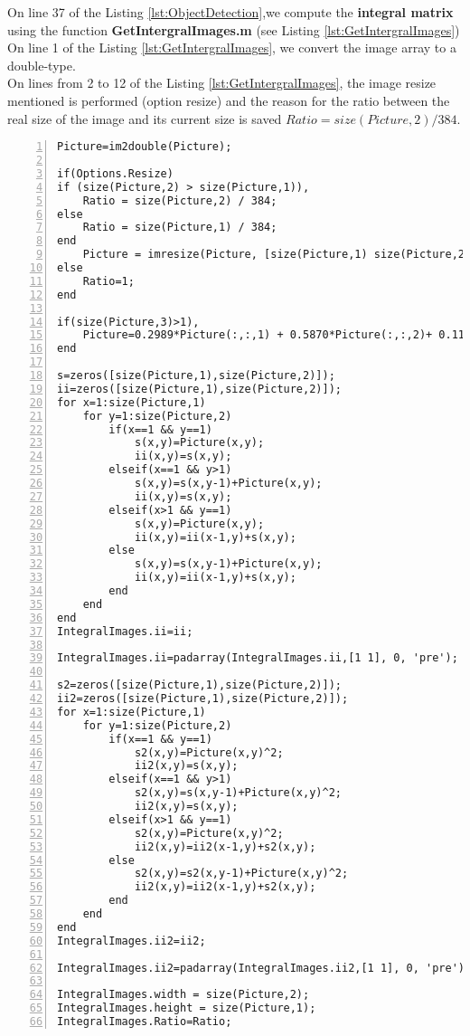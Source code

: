 \noindent On line 37 of the Listing \ref{lst:ObjectDetection},we compute the \textbf{integral matrix} using the function \textbf{GetIntergralImages.m} (see Listing \ref{lst:GetIntergralImages})\\

\noindent On line 1 of the Listing \ref{lst:GetIntergralImages}, we convert the image array to a double-type.\\

\noindent On lines from 2 to 12 of the Listing \ref{lst:GetIntergralImages}, the image resize mentioned is performed (option resize) and the reason for the ratio between the real size of the image and its current size is saved $Ratio=size(Picture,2)/384$.\\


\begin{lstlisting}[style=Matlab-editor, numbers=left,label={lst:GetIntergralImages},captionpos=b, caption={Code \textbf{GetIntergralImages.m} }]
Picture=im2double(Picture);

if(Options.Resize)
if (size(Picture,2) > size(Picture,1)),
	Ratio = size(Picture,2) / 384;
else
	Ratio = size(Picture,1) / 384;
end
	Picture = imresize(Picture, [size(Picture,1) size(Picture,2) ]/ Ratio);
else
	Ratio=1;
end

if(size(Picture,3)>1),
	Picture=0.2989*Picture(:,:,1) + 0.5870*Picture(:,:,2)+ 0.1140*Picture(:,:,3);
end

s=zeros([size(Picture,1),size(Picture,2)]);
ii=zeros([size(Picture,1),size(Picture,2)]);
for x=1:size(Picture,1)
	for y=1:size(Picture,2)
		if(x==1 && y==1)
			s(x,y)=Picture(x,y);
			ii(x,y)=s(x,y);
		elseif(x==1 && y>1)
			s(x,y)=s(x,y-1)+Picture(x,y);
			ii(x,y)=s(x,y);
		elseif(x>1 && y==1)
			s(x,y)=Picture(x,y);
			ii(x,y)=ii(x-1,y)+s(x,y);
		else
			s(x,y)=s(x,y-1)+Picture(x,y);
			ii(x,y)=ii(x-1,y)+s(x,y);
		end
	end
end
IntegralImages.ii=ii;

IntegralImages.ii=padarray(IntegralImages.ii,[1 1], 0, 'pre');

s2=zeros([size(Picture,1),size(Picture,2)]);
ii2=zeros([size(Picture,1),size(Picture,2)]);
for x=1:size(Picture,1)
	for y=1:size(Picture,2)
		if(x==1 && y==1)
			s2(x,y)=Picture(x,y)^2;
			ii2(x,y)=s(x,y);
		elseif(x==1 && y>1)
			s2(x,y)=s(x,y-1)+Picture(x,y)^2;
			ii2(x,y)=s(x,y);
		elseif(x>1 && y==1)
			s2(x,y)=Picture(x,y)^2;
			ii2(x,y)=ii2(x-1,y)+s2(x,y);
		else
			s2(x,y)=s2(x,y-1)+Picture(x,y)^2;
			ii2(x,y)=ii2(x-1,y)+s2(x,y);
		end
	end
end
IntegralImages.ii2=ii2;

IntegralImages.ii2=padarray(IntegralImages.ii2,[1 1], 0, 'pre');

IntegralImages.width = size(Picture,2);
IntegralImages.height = size(Picture,1);
IntegralImages.Ratio=Ratio;
\end{lstlisting}



